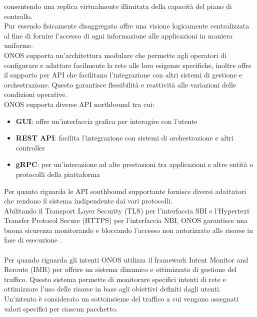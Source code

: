 consentendo una replica virtualmente illimitata della capacità del piano di controllo.
\\Pur essendo fisicamente disaggregato offre una visione logicamente centralizzata al fine di fornire l'accesso di ogni informazione alle applicazioni in maniera uniforme.
\\ONOS supporta un'architettura modulare che permette agli operatori di configurare e adattare facilmente la rete alle loro esigenze specifiche,
inoltre offre il supporto per API che facilitano l'integrazione con altri sistemi di gestione e orchestrazione.
Questo garantisce flessibilità e reattività alle variazioni delle condizioni operative.
\\ONOS supporta diverse API northbound tra cui:
\begin{itemize}
\item \textbf{GUI}: offre un'interfaccia grafica per interagire con l'utente
\item \textbf{REST API}: facilita l'integrazione con sistemi di orchestrazione e altri controller 
\item \textbf{gRPC}: per un'interazione ad alte prestazioni tra applicazioni e altre entità o protocolli della piattaforma
\end{itemize}
Per quanto riguarda le API southbound supportante fornisce diversi adattatori che rendono il sistema indipendente dai vari protocolli.
\\Abilitando il Transport Layer Security (TLS) per l'interfaccia SBI e l'Hypertext Transfer Protocol Secure (HTTPS) per l'interfaccia NBI, 
ONOS garantisce una buona sicurezza monitorando e bloccando l'accesso non autorizzato alle risorse in fase di esecuzione \cite{artONOS}.
\\
\\Per quando riguarda gli intenti ONOS utilizza il framework Intent Monitor and Reroute (IMR) per offrire un sistema dinamico e ottimizzato di gestione del traffico.
Questo sistema permette di monitorare specifici intenti di rete e ottimizzare l'uso delle risorse in base agli obiettivi definiti dagli utenti.
\\Un'intento è considerato un sottoinsieme del traffico a cui vengono assegnati valori specifici per ciascun pacchetto.
